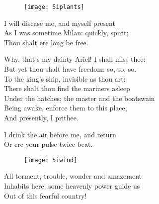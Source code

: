 \begin{verse_speech}[Prospero]
\begin{figure}[tb]
\centering
\texttt{[image: 5iplants]}
\end{figure}


I will discase me, and myself present\\
As I was sometime Milan: quickly, spirit;\\
Thou shalt ere long be free.
\end{verse_speech}

\begin{song}
\end{song}

\begin{verse_speech}[Prospero] 
Why, that's my dainty Ariel! I shall miss thee:\\
But yet thou shalt have freedom: so, so, so.\\
To the king's ship, invisible as thou art:\\
There shalt thou find the mariners asleep\\
Under the hatches; the master and the boatswain\\
Being awake, enforce them to this place,\\
And presently, I prithee.
\end{verse_speech}

\begin{verse_speech}[Ariel] 
I drink the air before me, and return\\
Or ere your pulse twice beat.
\end{verse_speech}

\exit{}


\begin{figure}[tb]
	\centering
	\texttt{[image: 5iwind]}
\end{figure}



\begin{verse_speech}[Gonzalo] 
All torment, trouble, wonder and amazement\\
Inhabits here: some heavenly power guide us\\
Out of this fearful country!
\end{verse_speech}

